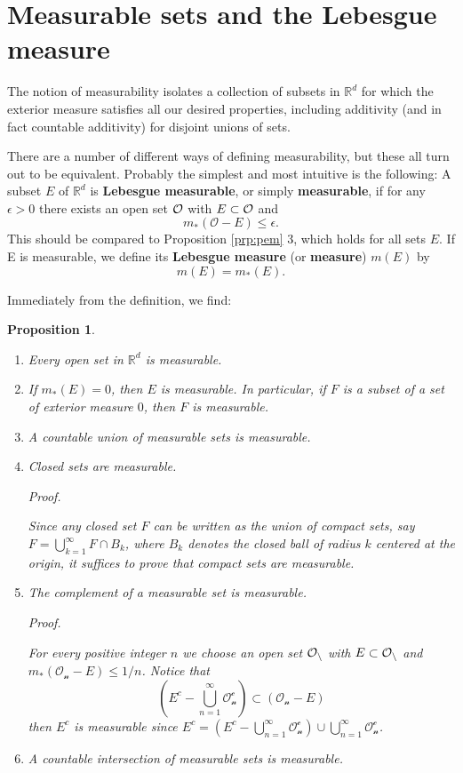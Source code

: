 \documentclass[
]{book}
\providecommand{\tightlist}{%
  \setlength{\itemsep}{0pt}\setlength{\parskip}{0pt}}
\newtheorem{proposition}{Proposition}[chapter]
\theoremstyle{definition}
\theoremstyle{definition}
\theoremstyle{definition}
\theoremstyle{definition}
\theoremstyle{remark}
\begin{document}
\section{Measurable sets and the Lebesgue measure}\label{measurable-sets-and-the-lebesgue-measure}

The notion of measurability isolates a collection of subsets in \(\mathbb{R}^d\) for which the exterior measure satisfies all our desired properties, including additivity (and in fact countable additivity) for disjoint unions of sets.

There are a number of different ways of defining measurability, but these all turn out to be equivalent. Probably the simplest and most intuitive is the following: A subset \(E\) of \(\mathbb{R}^d\) is \textbf{Lebesgue measurable}, or simply \textbf{measurable}, if for any \(\epsilon > 0\) there exists an open set \(\cal O\) with \(E\subset\cal O\) and
\[
m_{\ast}(\mathcal{O}-E) ≤ \epsilon.
\]
This should be compared to Proposition \ref{prp:pem} 3, which holds for all sets \(E\). If E is measurable, we define its \textbf{Lebesgue measure} (or \textbf{measure}) \(m(E)\) by
\[
m(E)=m_{\ast}(E).
\]

Immediately from the definition, we find:

\begin{proposition}
\leavevmode

\begin{enumerate}
\def\labelenumi{\arabic{enumi}.}
\tightlist
\item
  Every open set in \(\mathbb{R}^d\) is measurable.
\item
  If \(m_{\ast}(E)=0\), then \(E\) is measurable. In particular, if \(F\) is a subset of a set of exterior measure \(0\), then \(F\) is measurable.
\item
  A countable union of measurable sets is measurable.
\item
  Closed sets are measurable.

  \emph{Proof.}

  Since any closed set \(F\) can be written as the union of compact sets, say \(F=\bigcup_{k=1}^{\infty}F\cap B_k\), where \(B_k\) denotes the closed ball of radius \(k\) centered at the origin, it suffices to prove that compact sets are measurable.
\item
  The complement of a measurable set is measurable.

  \emph{Proof.}

  For every positive integer \(n\) we choose an open set \(\cal O_n\) with \(E\subset \cal O_n\) and \(m_{\ast}(\mathcal{O_n}-E)\leq 1/n\). Notice that
  \[
    (E^c-\bigcup_{n=1}^{\infty}\mathcal{O_n^c}) \subset(\mathcal{O_n}-E)
  \]
  then \(E^c\) is measurable since \(E^c=(E^c-\bigcup_{n=1}^{\infty}\mathcal{O_n^c})\cup \bigcup_{n=1}^{\infty}\mathcal{O_n^c}\).
\item
  A countable intersection of measurable sets is measurable.
\end{enumerate}

\end{proposition}
\end{document}
